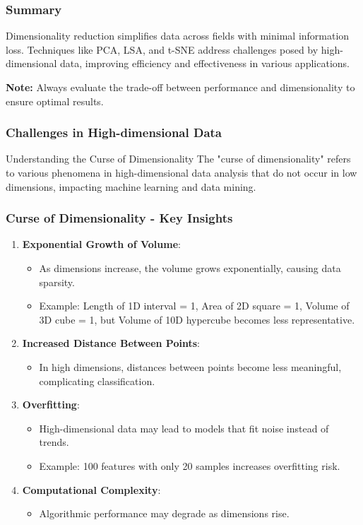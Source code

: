 \documentclass[aspectratio=169]{beamer}
\begin{document}
\begin{frame}[fragile]
    \frametitle{Summary}
    Dimensionality reduction simplifies data across fields with minimal information loss. Techniques like PCA, LSA, and t-SNE address challenges posed by high-dimensional data, improving efficiency and effectiveness in various applications.
    
    \textbf{Note:} Always evaluate the trade-off between performance and dimensionality to ensure optimal results. 
\end{frame}

\begin{frame}[fragile]
    \frametitle{Challenges in High-dimensional Data}
    \begin{block}{Understanding the Curse of Dimensionality}
        The "curse of dimensionality" refers to various phenomena in high-dimensional data analysis that do not occur in low dimensions, impacting machine learning and data mining.
    \end{block}
\end{frame}

\begin{frame}[fragile]
    \frametitle{Curse of Dimensionality - Key Insights}
    \begin{enumerate}
        \item \textbf{Exponential Growth of Volume}:
        \begin{itemize}
            \item As dimensions increase, the volume grows exponentially, causing data sparsity.
            \item Example: Length of 1D interval = 1, Area of 2D square = 1, Volume of 3D cube = 1, but Volume of 10D hypercube becomes less representative.
        \end{itemize}
        
        \item \textbf{Increased Distance Between Points}:
        \begin{itemize}
            \item In high dimensions, distances between points become less meaningful, complicating classification.
        \end{itemize}
        
        \item \textbf{Overfitting}:
        \begin{itemize}
            \item High-dimensional data may lead to models that fit noise instead of trends.
            \item Example: 100 features with only 20 samples increases overfitting risk.
        \end{itemize}
        
        \item \textbf{Computational Complexity}:
        \begin{itemize}
            \item Algorithmic performance may degrade as dimensions rise.
        \end{itemize}
    \end{enumerate}
\end{frame}
\end{document}
